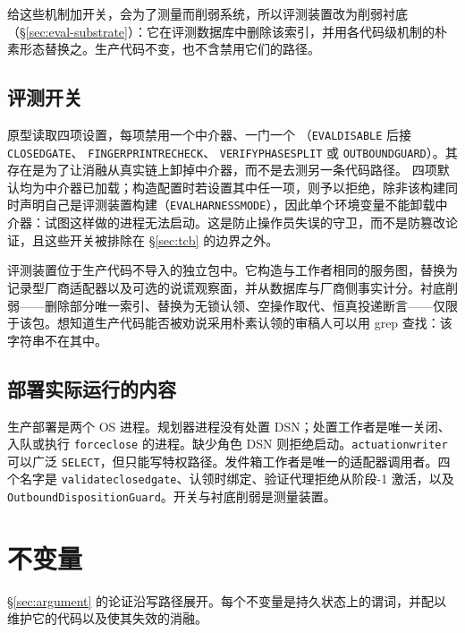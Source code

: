 \documentclass[acmsmall,manuscript,review,anonymous]{acmart}
\renewcommand{\_}{\discretionary{\textunderscore}{}{\textunderscore}}
\begin{document}
给这些机制加开关，会为了测量而削弱系统，所以评测装置改为削弱衬底（\S\ref{sec:eval-substrate}）：它在评测数据库中删除该索引，并用各代码级机制的朴素形态替换之。生产代码不变，也不含禁用它们的路径。

\subsection{评测开关}
\label{sec:impl-switches}

\begin{sloppypar}
原型读取四项设置，每项禁用一个中介器、一门一个
（\texttt{EVAL\_DISABLE\_} 后接 \texttt{CLOSED\_GATE}、
\texttt{FINGERPRINT\_RECHECK}、
\texttt{VERIFY\_PHASE\_SPLIT} 或
\texttt{OUTBOUND\_GUARD}）。其存在是为了让消融从真实链上卸掉中介器，而不是去测另一条代码路径。
四项默认均为中介器已加载；构造配置时若设置其中任一项，则予以拒绝，除非该构建同时声明自己是评测装置构建（\texttt{EVAL\_HARNESS\_MODE}），因此单个环境变量不能卸载中介器：试图这样做的进程无法启动。这是防止操作员失误的守卫，而不是防篡改论证，且这些开关被排除在 \S\ref{sec:tcb} 的边界之外。
\end{sloppypar}

评测装置位于生产代码不导入的独立包中。它构造与工作者相同的服务图，替换为记录型厂商适配器以及可选的说谎观察面，并从数据库与厂商侧事实计分。衬底削弱——删除部分唯一索引、替换为无锁认领、空操作取代、恒真投递断言——仅限于该包。想知道生产代码能否被劝说采用朴素认领的审稿人可以用 grep 查找：该字符串不在其中。

\subsection{部署实际运行的内容}
\label{sec:impl-deploy}

生产部署是两个 {OS} 进程。规划器进程没有处置 {DSN}；处置工作者是唯一关闭、入队或执行 \texttt{force\_close} 的进程。缺少角色 {DSN} 则拒绝启动。\texttt{actuation\_writer} 可以广泛 \texttt{SELECT}，但只能写特权路径。发件箱工作者是唯一的适配器调用者。四个名字是
\texttt{validate\_closed\_gate}、认领时绑定、验证代理拒绝从阶段-1 激活，以及
\texttt{OutboundDispositionGuard}。开关与衬底削弱是测量装置。

\section{不变量}
\label{sec:inv}

\S\ref{sec:argument} 的论证沿写路径展开。每个不变量是持久状态上的谓词，并配以维护它的代码以及使其失效的消融。
\end{document}
